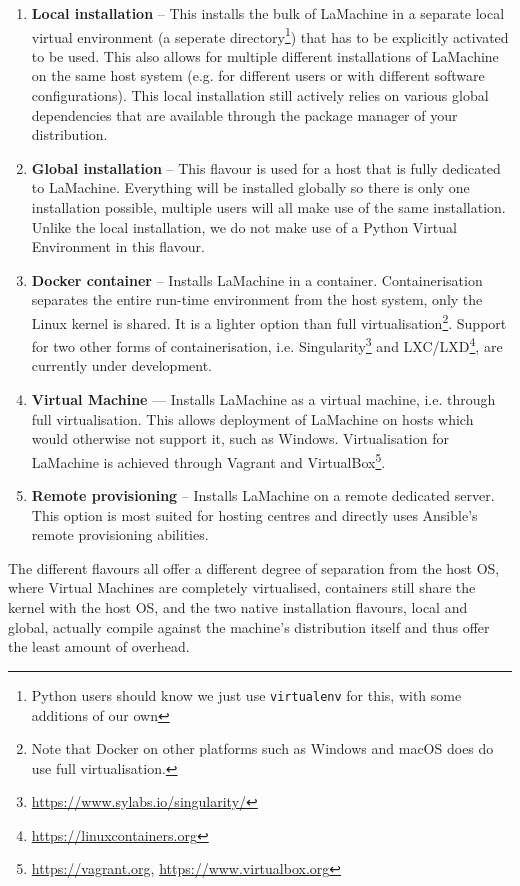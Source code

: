 \documentclass[a4paper,11pt]{article}
\begin{document}
\begin{enumerate}
    \item \textbf{Local installation} -- This installs the bulk of LaMachine in a separate local virtual environment (a seperate
        directory\footnote{Python users should know we just use \texttt{virtualenv} for this, with some
        additions of our own}) that has to be explicitly activated to be used. This also allows for multiple different installations
        of LaMachine on the same host system (e.g. for different users or with different software configurations).
        This local installation still actively relies on various global dependencies that are available through the
        package manager of your distribution.
    \item \textbf{Global installation} -- This flavour is used for a host that is fully dedicated to LaMachine. Everything will be
        installed globally so there is only one installation possible, multiple users will all make use of the same
        installation. Unlike the local installation, we do not make use of a Python Virtual Environment in this flavour.
    \item \textbf{Docker container} -- Installs LaMachine in a container. Containerisation separates the entire run-time
        environment from the host system, only the Linux kernel is shared. It is a lighter option than full
        virtualisation\footnote{Note that Docker on other platforms such as Windows and macOS does do use full
        virtualisation.}.  Support for two other forms of containerisation, i.e. Singularity\footnote{\url{https://www.sylabs.io/singularity/}} and
            LXC/LXD\footnote{\url{https://linuxcontainers.org}}, are currently under development.
    \item \textbf{Virtual Machine} --- Installs LaMachine as a virtual machine, i.e. through full virtualisation. This allows
        deployment of LaMachine on hosts which would otherwise not support it, such as Windows. Virtualisation for
        LaMachine is achieved through Vagrant and VirtualBox\footnote{\url{https://vagrant.org}, \url{https://www.virtualbox.org}}.
    \item \textbf{Remote provisioning} -- Installs LaMachine on a remote dedicated server. This option is most suited for
        hosting centres and directly uses Ansible's remote provisioning abilities.
\end{enumerate}

The different flavours all offer a different degree of separation from the host OS, where Virtual Machines are
completely virtualised, containers still share the kernel with the host OS, and the two native installation flavours,
local and global, actually compile against the machine's distribution itself and thus offer the least amount of
overhead.
\end{document}
